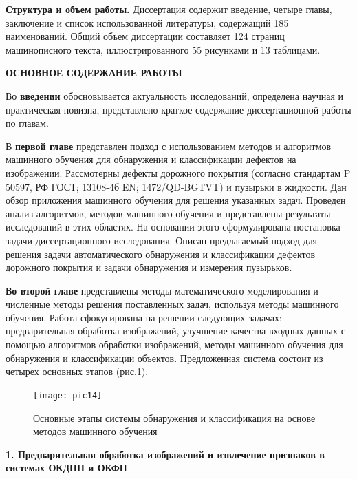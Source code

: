 \textbf{Структура и объем работы.} Диссертация содержит введение, четыре главы, заключение и список использованной литературы, содержащий 185 наименований. Общий объем диссертации составляет 124 страниц машинописного текста, иллюстрированного 55 рисунками и 13 таблицами.
\begin{center}
\textbf{ОСНОВНОЕ СОДЕРЖАНИЕ РАБОТЫ}
\end{center}

Во {\textbf{введении}} обосновывается актуальность исследований, определена научная и практическая новизна, представлено краткое содержание диссертационной работы по главам.

В \textbf {первой главе} представлен подход с использованием методов и алгоритмов машинного обучения для обнаружения и классификации дефектов на изображении. Рассмотерны дефекты дорожного покрытия (согласно стандартам P 50597, РФ ГОСТ; 13108-4б EN; 1472/QD-BGTVT) и пузырьки в жидкости. Дан обзор приложения машинного обучения для решения указанных задач. Проведен анализ алгоритмов, методов машинного обучения и представлены результаты исследований в этих областях. На основании этого сформулирована постановка задачи диссертационного исследования. Описан предлагаемый подход для решения задачи автоматического обнаружения и классификации дефектов дорожного покрытия и задачи обнаружения и измерения пузырьков.

 \textbf{Во второй главе} представлены методы математического моделирования и численные методы решения поставленных задач, используя методы машинного обучения. Работа сфокусирована на решении следующих задачах: предварительная обработка изображений, улучшение качества входных данных с помощью алгоритмов обработки изображений, методы машинного обучения для обнаружения и классификации объектов. Предложенная система состоит из четырех основных этапов (рис.\ref{pic14}).

\begin{figure}[ht!]
\centering
\texttt{[image: pic14]}
\caption{Основные этапы системы обнаружения и классификация на основе методов машинного обучения}
	\label{pic14}
	\end{figure}

\textbf{1. Предварительная обработка изображений и извлечение признаков в системах ОКДПП и ОКФП}

